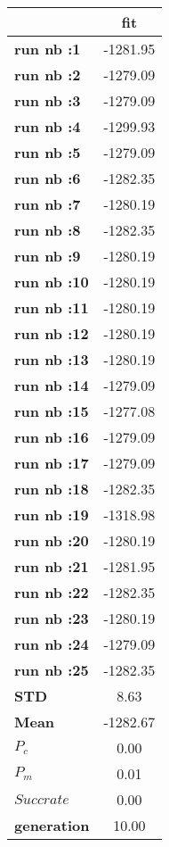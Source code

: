 \begin{tiny}\begin{tabular}{|l|c|}
\hline
&\textbf{fit}\\\hline
\textbf{run nb :1}&-1281.95\\\hline
\textbf{run nb :2}&-1279.09\\\hline
\textbf{run nb :3}&-1279.09\\\hline
\textbf{run nb :4}&-1299.93\\\hline
\textbf{run nb :5}&-1279.09\\\hline
\textbf{run nb :6}&-1282.35\\\hline
\textbf{run nb :7}&-1280.19\\\hline
\textbf{run nb :8}&-1282.35\\\hline
\textbf{run nb :9}&-1280.19\\\hline
\textbf{run nb :10}&-1280.19\\\hline
\textbf{run nb :11}&-1280.19\\\hline
\textbf{run nb :12}&-1280.19\\\hline
\textbf{run nb :13}&-1280.19\\\hline
\textbf{run nb :14}&-1279.09\\\hline
\textbf{run nb :15}&-1277.08\\\hline
\textbf{run nb :16}&-1279.09\\\hline
\textbf{run nb :17}&-1279.09\\\hline
\textbf{run nb :18}&-1282.35\\\hline
\textbf{run nb :19}&-1318.98\\\hline
\textbf{run nb :20}&-1280.19\\\hline
\textbf{run nb :21}&-1281.95\\\hline
\textbf{run nb :22}&-1282.35\\\hline
\textbf{run nb :23}&-1280.19\\\hline
\textbf{run nb :24}&-1279.09\\\hline
\textbf{run nb :25}&-1282.35\\\hline
\textbf{STD}&8.63\\\hline
\textbf{Mean}&-1282.67\\\hline
\textbf{$P_c$}&0.00\\\hline
\textbf{$P_{m}$}&0.01\\\hline
\textbf{$Succ rate$}&0.00\\\hline
\textbf{generation}&10.00\\\hline
\end{tabular}
\end{tiny}